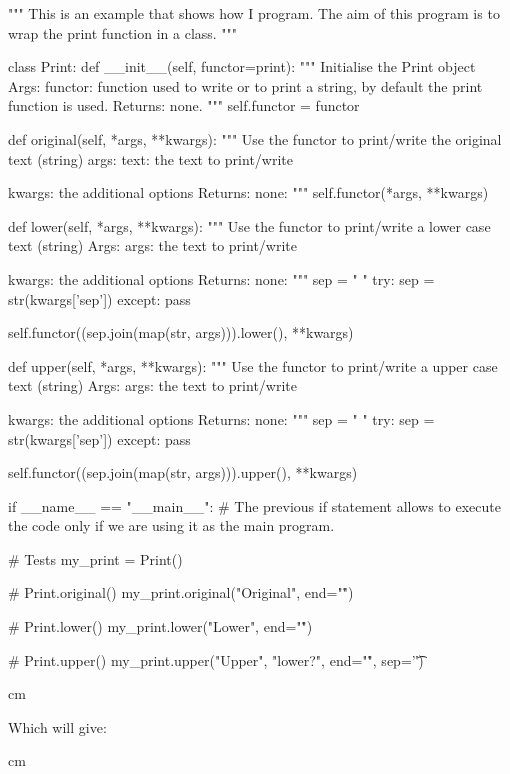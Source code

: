 \documentclass[english, 12 pt, openany, oneside]{book}
\begin{document}
\begin{pyblock}[][breaklines]
"""
This is an example that shows how I program.
The aim of this program is to wrap the print function in a class.
"""

class Print:
	def __init__(self, functor=print):
		""" Initialise the Print object
			Args:
				functor:
				function used to write or to print a string, by default the print function is used.
			Returns:
			none.
		"""
		self.functor = functor
		
	def original(self, *args, **kwargs):
		""" Use the functor to print/write the original text (string)
			args:
				text:
				the text to print/write

				kwargs:
				the additional options
			Returns:
			none:			
		"""
		self.functor(*args, **kwargs)
	
	def lower(self, *args, **kwargs):
		""" Use the functor to print/write a lower case text (string)
			Args:
				args:
				the text to print/write

				kwargs:
				the additional options
			Returns:
			none:	
		"""
		sep = " "
		try:
			sep = str(kwargs['sep'])
		except:
			pass

		self.functor((sep.join(map(str, args))).lower(), **kwargs)
		
	def upper(self, *args, **kwargs):
		""" Use the functor to print/write a upper case text (string)
			Args:
				args:
				the text to print/write

				kwargs:
				the additional options
			Returns:
			none:	
		"""
		sep = " "
		try:
			sep = str(kwargs['sep'])
		except:
			pass

		self.functor((sep.join(map(str, args))).upper(), **kwargs)
		
if __name__ == "__main__":
	# The previous if statement allows to execute the code only if we are using it as the main program.
	
	# Tests
	my_print = Print()
	
	# Print.original()
	my_print.original("Original", end="\n\r")
	
	# Print.lower()
	my_print.lower("Lower", end="\n\r")
	
	# Print.upper()
	my_print.upper("Upper", "lower?", end="\n\r", sep='\t')
\end{pyblock}

 cm

Which will give:

 cm

\textquote{\printpythontex}
\end{document}
